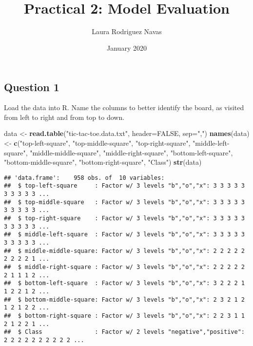 \documentclass[]{article}
\title{Practical 2: Model Evaluation}
\author{Laura Rodriguez Navas}
\date{January 2020}
\newenvironment{Shaded}{\begin{snugshade}}{\end{snugshade}}
\newcommand{\DataTypeTok}[1]{\textcolor[rgb]{0.13,0.29,0.53}{#1}}
\newcommand{\KeywordTok}[1]{\textcolor[rgb]{0.13,0.29,0.53}{\textbf{#1}}}
\newcommand{\NormalTok}[1]{#1}
\newcommand{\OtherTok}[1]{\textcolor[rgb]{0.56,0.35,0.01}{#1}}
\newcommand{\StringTok}[1]{\textcolor[rgb]{0.31,0.60,0.02}{#1}}
\begin{document}
\maketitle

\hypertarget{question-1}{%
\subsection{Question 1}\label{question-1}}

Load the data into R. Name the columns to better identify the board, as
visited from left to right and from top to down.

\begin{Shaded}
\begin{Highlighting}[]
\NormalTok{data <-}\StringTok{ }\KeywordTok{read.table}\NormalTok{(}\StringTok{"tic-tac-toe.data.txt"}\NormalTok{, }\DataTypeTok{header=}\OtherTok{FALSE}\NormalTok{, }\DataTypeTok{sep=}\StringTok{","}\NormalTok{)}
\KeywordTok{names}\NormalTok{(data) <-}\StringTok{ }\KeywordTok{c}\NormalTok{(}\StringTok{"top-left-square"}\NormalTok{, }
                 \StringTok{"top-middle-square"}\NormalTok{, }
                 \StringTok{"top-right-square"}\NormalTok{, }
                 \StringTok{"middle-left-square"}\NormalTok{, }
                 \StringTok{"middle-middle-square"}\NormalTok{, }
                 \StringTok{"middle-right-square"}\NormalTok{, }
                 \StringTok{"bottom-left-square"}\NormalTok{, }
                 \StringTok{"bottom-middle-square"}\NormalTok{,}
                 \StringTok{"bottom-right-square"}\NormalTok{, }
                 \StringTok{"Class"}\NormalTok{)}
\KeywordTok{str}\NormalTok{(data)}
\end{Highlighting}
\end{Shaded}

\begin{verbatim}
## 'data.frame':    958 obs. of  10 variables:
##  $ top-left-square     : Factor w/ 3 levels "b","o","x": 3 3 3 3 3 3 3 3 3 3 ...
##  $ top-middle-square   : Factor w/ 3 levels "b","o","x": 3 3 3 3 3 3 3 3 3 3 ...
##  $ top-right-square    : Factor w/ 3 levels "b","o","x": 3 3 3 3 3 3 3 3 3 3 ...
##  $ middle-left-square  : Factor w/ 3 levels "b","o","x": 3 3 3 3 3 3 3 3 3 3 ...
##  $ middle-middle-square: Factor w/ 3 levels "b","o","x": 2 2 2 2 2 2 2 2 2 1 ...
##  $ middle-right-square : Factor w/ 3 levels "b","o","x": 2 2 2 2 2 2 1 1 1 2 ...
##  $ bottom-left-square  : Factor w/ 3 levels "b","o","x": 3 2 2 2 1 1 2 2 1 2 ...
##  $ bottom-middle-square: Factor w/ 3 levels "b","o","x": 2 3 2 1 2 1 2 1 2 2 ...
##  $ bottom-right-square : Factor w/ 3 levels "b","o","x": 2 2 3 1 1 2 1 2 2 1 ...
##  $ Class               : Factor w/ 2 levels "negative","positive": 2 2 2 2 2 2 2 2 2 2 ...
\end{verbatim}
\end{document}
